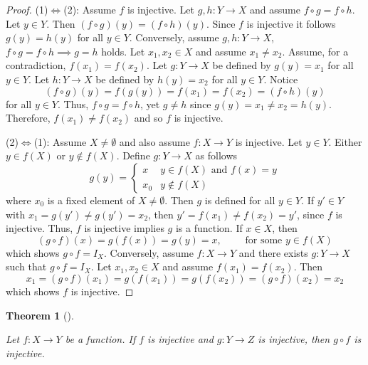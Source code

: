 \documentclass[
  letterpaper,
  10pt,
  reqno,
  twopage,
  openany]{book}
\theoremstyle{plain}
\theoremstyle{definition}
\theoremstyle{definition}
\theoremstyle{definition}
\theoremstyle{plain}
\theoremstyle{plain}
\newtheorem{theorem}{Theorem}[chapter]
\theoremstyle{remark}
\begin{document}
\begin{proof}

(1)\(\Leftrightarrow\)(2): Assume \(f\) is injective. Let \(g,h:Y\to X\)
and assume \(f\circ g= f\circ h\). Let \(y\in Y\). Then
\((f\circ g)(y)=(f\circ h)(y)\). Since \(f\) is injective it follows
\(g(y)=h(y)\) for all \(y\in Y.\) Conversely, assume \(g,h:Y\to X\),
\(f\circ g=f\circ h \implies g=h\) holds. Let \(x_1, x_2\in X\) and
assume \(x_1\neq x_2\). Assume, for a contradiction, \(f(x_1)=f(x_2)\).
Let \(g:Y\to X\) be defined by \(g(y)=x_1\) for all \(y\in Y\). Let
\(h:Y\to X\) be defined by \(h(y)=x_2\) for all \(y\in Y\). Notice \[
(f\circ g)(y)=f(g(y))=f(x_1)=f(x_2)=(f\circ h)(y)
\] for all \(y\in Y\). Thus, \(f\circ g=f\circ h\), yet \(g\neq h\)
since \(g(y)=x_1\neq x_2=h(y)\). Therefore, \(f(x_1)\neq f(x_2)\) and so
\(f\) is injective.

(2)\(\Leftrightarrow\)(1): Assume \(X\neq \emptyset\) and also assume
\(f:X\to Y\) is injective. Let \(y\in Y\). Either \(y\in f(X)\) or
\(y\notin f(X)\). Define \(g:Y\to X\) as follows \begin{equation}
g(y)=
\begin{cases}
x & y\in f(X) \text{ and } f(x)=y \\
x_0 & y \notin f(X) 
\end{cases}
\end{equation} where \(x_0\) is a fixed element of \(X\neq \emptyset\).
Then \(g\) is defined for all \(y\in Y\). If \(y'\in Y\) with
\(x_1=g(y')\neq g(y')=x_2\), then \(y'=f(x_1)\neq f(x_2)=y'\), since
\(f\) is injective. Thus, \(f\) is injective implies \(g\) is a
function. If \(x\in X\), then \[
(g\circ f)(x)=g(f(x))=g(y)=x, \qquad \text{ for some $y\in f(X)$}
\] which shows \(g\circ f=I_X\). Conversely, assume \(f:X\to Y\) and
there exists \(g:Y\to X\) such that \(g\circ f=I_X\). Let
\(x_1,x_2\in X\) and assume \(f(x_1)=f(x_2)\). Then \[
x_1=(g\circ f)(x_1)=g(f(x_1))=g(f(x_2))=(g\circ f)(x_2)=x_2
\] which shows \(f\) is injective.

\end{proof}

\leavevmode{}%
\begin{theorem}[]\label{thm-injective-then}

Let \(f:X\to Y\) be a function. If \(f\) is injective and \(g:Y\to Z\)
is injective, then \(g\circ f\) is injective.

\end{theorem}
\end{document}
